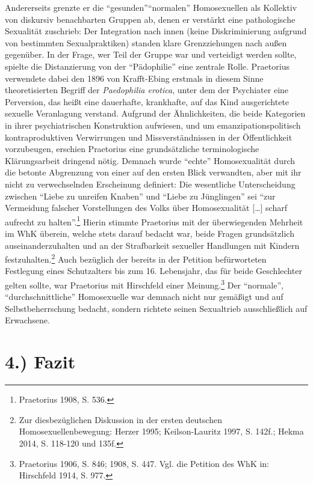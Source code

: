 \documentclass[a4paper,
fontsize=11pt,
oneside,
numbers=noperiodatend,
parskip=half-,
bibliography=totoc,
final
]{scrartcl}
\begin{document}
Andererseits grenzte er die \enquote{gesunden}\enquote{normalen}
Homosexuellen als Kollektiv von diskursiv benachbarten Gruppen ab, denen
er verstärkt eine pathologische Sexualität zuschrieb: Der Integration
nach innen (keine Diskriminierung aufgrund von bestimmten
Sexualpraktiken) standen klare Grenzziehungen nach außen gegenüber. In
der Frage, wer Teil der Gruppe war und verteidigt werden sollte, spielte
die Distanzierung von der \enquote{Pädophilie} eine zentrale Rolle.
Praetorius verwendete dabei den 1896 von Krafft-Ebing erstmals in diesem
Sinne theoretisierten Begriff der \emph{Paedophilia erotica}, unter dem
der Psychiater eine Perversion, das heißt eine dauerhafte, krankhafte,
auf das Kind ausgerichtete sexuelle Veranlagung verstand. Aufgrund der
Ähnlichkeiten, die beide Kategorien in ihrer psychiatrischen
Konstruktion aufwiesen, und um emanzipationspolitisch kontraproduktiven
Verwirrungen und Missverständnissen in der Öffentlichkeit vorzubeugen,
erschien Praetorius eine grundsätzliche terminologische Klärungsarbeit
dringend nötig. Demnach wurde \enquote{echte} Homosexualität durch die
betonte Abgrenzung von einer auf den ersten Blick verwandten, aber mit
ihr nicht zu verwechselnden Erscheinung definiert: Die wesentliche
Unterscheidung zwischen \enquote{Liebe zu unreifen Knaben} und
\enquote{Liebe zu Jünglingen} sei \enquote{zur Vermeidung falscher
Vorstellungen des Volks über Homosexualität {[}\ldots{}{]} scharf
aufrecht zu halten}.\footnote{Praetorius 1908, S. 536.} Hierin stimmte
Praetorius mit der überwiegenden Mehrheit im WhK überein, welche stets
darauf bedacht war, beide Fragen grundsätzlich auseinanderzuhalten und
an der Strafbarkeit sexueller Handlungen mit Kindern
festzuhalten.\footnote{Zur diesbezüglichen Diskussion in der ersten
  deutschen Homosexuellenbewegung: Herzer 1995; Keilson-Lauritz 1997, S.
  142f.; Hekma 2014, S. 118-120 und 135f.} Auch bezüglich der bereits in
der Petition befürworteten Festlegung eines Schutzalters bis zum 16.
Lebensjahr, das für beide Geschlechter gelten sollte, war Praetorius mit
Hirschfeld einer Meinung.\footnote{Praetorius 1906, S. 846; 1908, S.
  447. Vgl. die Petition des WhK in: Hirschfeld 1914, S. 977.} Der
\enquote{normale}, \enquote{durchschnittliche} Homosexuelle war demnach
nicht nur gemäßigt und auf Selbstbeherrschung bedacht, sondern richtete
seinen Sexualtrieb ausschließlich auf Erwachsene.

\section*{4.) Fazit}\label{fazit}
\end{document}
